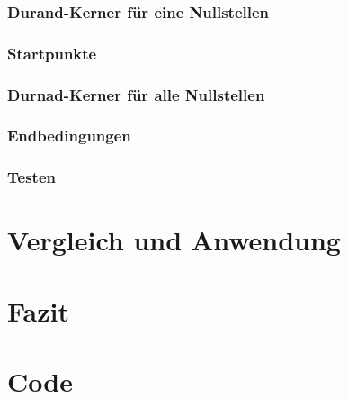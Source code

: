 \documentclass[12pt]{article}
\begin{document}
    \subsubsection{Durand-Kerner für eine Nullstellen}
    \subsubsection{Startpunkte}
    \subsubsection{Durnad-Kerner für alle Nullstellen}
    \subsubsection{Endbedingungen}
    \subsubsection{Testen}

\section{Vergleich und Anwendung}

\section{Fazit}

\section{Code}
\end{document}
